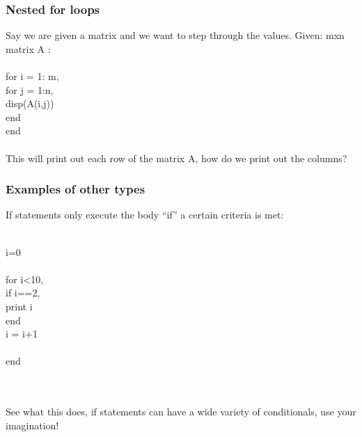 \documentclass{beamer}
\newcommand{\tab}{\hspace{10mm}}
\begin{document}
\begin{frame}
\frametitle{Nested for loops} 

Say we are given a matrix and we want to step through the values. Given: mxn matrix A : \\
\ \\
for i = 1: m,\\
\tab for j = 1:n, \\
\tab \tab disp(A(i,j))\\
\tab end\\
end\\
\ \\
This will print out each row of the matrix A, how do we print out the columns? 

\end{frame}

\begin{frame}
\frametitle{Examples of other types } 

If statements only execute the body ``if'' a certain criteria is met: 

\ \\
i=0\\
\ \\
for i<10,\\
\tab if i==2,\\
\tab \tab print i \\
\tab end \\

\tab i = i+1 \\
\ \\
end

\ \\
\ \\
See what this does, if statements can have a wide variety of conditionals, use your imagination! 



\end{frame}
\end{document}
